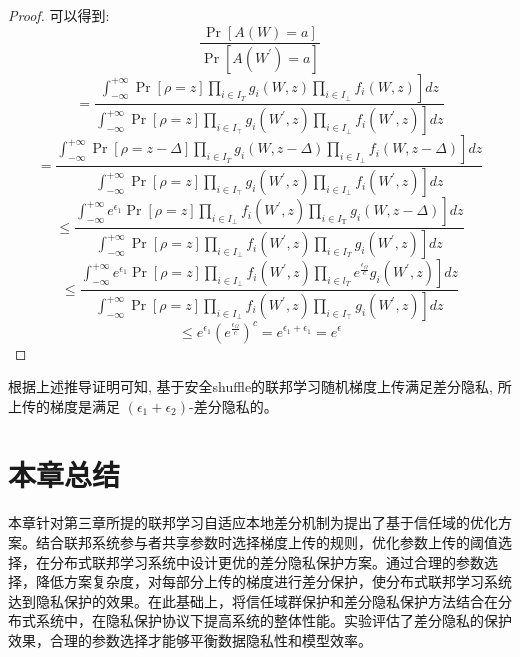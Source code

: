 \begin{proof}
可以得到:
$$
\frac{\operatorname{Pr}[A(W)=a]}{\operatorname{Pr}\left[A\left(W^{\prime}\right)=a\right]}$$
$$=\frac{ \left.\int_{-\infty}^{+\infty} \operatorname{Pr}[\rho=z] \prod_{i \in I_{T}} g_{i}(W, z) \prod_{i \in I_{\perp}} f_{i}(W, z)\right] d z}{ \left.\int_{-\infty}^{+\infty} \operatorname{Pr}[\rho=z] \prod_{i \in I_{\top}} g_{i}\left(W^{\prime}, z\right) \prod_{i \in I_{\perp}} f_{i}\left(W^{\prime}, z\right)\right] d z}$$
$$=\frac{ \left.\int_{-\infty}^{+\infty} \operatorname{Pr}[\rho=z-\Delta] \prod_{i \in I_{T}} g_{i}(W, z-\Delta) \prod_{i \in I_{\perp}} f_{i}(W, z-\Delta)\right] d z}{ \left.\int_{-\infty}^{+\infty} \operatorname{Pr}[\rho=z] \prod_{i \in I_{\top}} g_{i}\left(W^{\prime}, z\right) \prod_{i \in I_{\perp}} f_{i}\left(W^{\prime}, z\right)\right] d z}$$
$$\leq \frac{ \left.\int_{-\infty}^{+\infty} e^{\epsilon_{1}} \operatorname{Pr}[\rho=z] \prod_{i \in I_{\perp}} f_{i}\left(W^{\prime}, z\right) \prod_{i \in I_{\mathrm{T}}} g_{i}(W, z-\Delta)\right] d z}{ \left.\int_{-\infty}^{+\infty} \operatorname{Pr}[\rho=z] \prod_{i \in I_{\perp}} f_{i}\left(W^{\prime}, z\right) \prod_{i \in I_{T}} g_{i}\left(W^{\prime}, z\right)\right] d z}$$
$$\leq \frac{ \left.\int_{-\infty}^{+\infty} e^{\epsilon_{1}} \operatorname{Pr}[\rho=z] \prod_{i \in I_{\perp}} f_{i}\left(W^{\prime}, z\right) \prod_{i \in l_{T}} e^{\frac{\epsilon_{\Omega}}{c}} g_{i}\left(W^{\prime}, z\right)\right] d z}{ \left.\int_{-\infty}^{+\infty} \operatorname{Pr}[\rho=z] \prod_{i \in I_{\perp}} f_{i}\left(W^{\prime}, z\right) \prod_{i \in I_{\top}} g_{i}\left(W^{\prime}, z\right)\right] d z}$$
$$\leq e^{\epsilon_{1}}\left(e^{\frac{\epsilon_{\Omega}}{c}}\right)^{c}=e^{\epsilon_{1}+\epsilon_{1}}=e^{\epsilon}$$
\end{proof}

根据上述推导证明可知, 基于安全shuffle的联邦学习随机梯度上传满足差分隐私, 所上传的梯度是满足 $\left(\epsilon_{1}+\epsilon_{2}\right)$-差分隐私的。

\section{本章总结}
本章针对第三章所提的联邦学习自适应本地差分机制为提出了基于信任域的优化方案。结合联邦系统参与者共享参数时选择梯度上传的规则，优化参数上传的阈值选择，在分布式联邦学习系统中设计更优的差分隐私保护方案。通过合理的参数选择，降低方案复杂度，对每部分上传的梯度进行差分保护，使分布式联邦学习系统达到隐私保护的效果。在此基础上，将信任域群保护和差分隐私保护方法结合在分布式系统中，在隐私保护协议下提高系统的整体性能。实验评估了差分隐私的保护效果，合理的参数选择才能够平衡数据隐私性和模型效率。




























